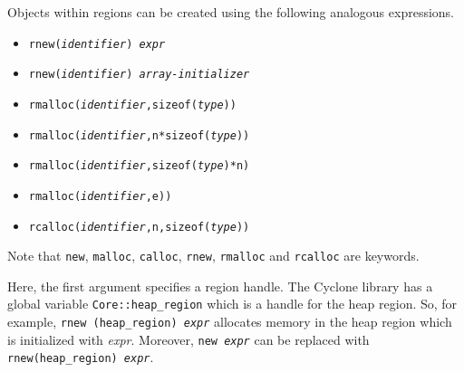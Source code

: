 
Objects within regions can be created using the following analogous
expressions.
\begin{itemize}
\item \texttt{rnew({\it identifier}) {\it expr}}
\item \texttt{rnew({\it identifier}) {\it array-initializer}}
\item \texttt{rmalloc({\it identifier},sizeof({\it type}))}
\item \texttt{rmalloc({\it identifier},n*sizeof({\it type}))}
\item \texttt{rmalloc({\it identifier},sizeof({\it type})*n)}
\item \texttt{rmalloc({\it identifier},e))}
\item \texttt{rcalloc({\it identifier},n,sizeof({\it type}))}
\end{itemize}
Note that \texttt{new}, \texttt{malloc}, \texttt{calloc}, 
\texttt{rnew}, \texttt{rmalloc} and \texttt{rcalloc} are keywords.

Here, the first argument specifies a region handle.  The Cyclone
library has a global variable \texttt{Core::heap\_region} which is a
handle for the heap region. So, for example, \texttt{rnew
(heap\_region) {\it expr}} allocates memory in the heap region which is
initialized with {\it expr}.  Moreover, \texttt{new {\it expr}} can be
replaced with \texttt{rnew(heap\_region) {\it expr}}.

